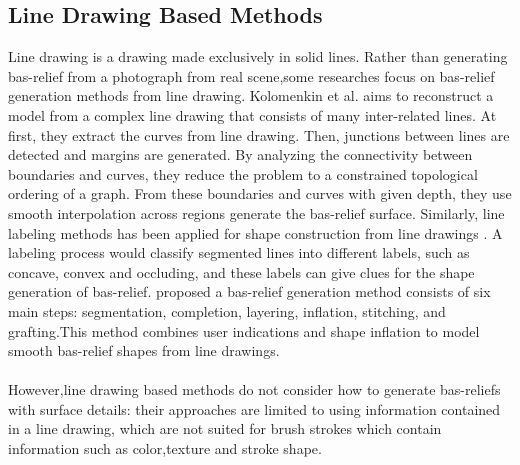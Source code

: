 \subsection{Line Drawing Based Methods}
Line drawing is a drawing made exclusively in solid lines. Rather than generating bas-relief from a photograph from real scene,some researches focus on bas-relief generation methods from line drawing.
Kolomenkin et al.\cite{kolomenkin2011reconstruction}  aims to reconstruct a model from a complex line drawing that consists of many inter-related lines. At first, they extract the curves from line drawing. Then, junctions between lines are detected and margins are generated. By analyzing the connectivity between boundaries and curves, they reduce the problem to a constrained topological ordering of a graph. From these boundaries and curves with given depth, they use smooth interpolation across regions generate the bas-relief surface. Similarly, line labeling methods has been applied for shape construction from line drawings  \cite{varley2002estimating}\cite{malik1987interpreting}\cite{sykora2014ink}. A labeling process would classify segmented lines into different labels, such as concave, convex and occluding, and these labels can give clues for the shape generation of bas-relief. 
\cite{sykora2014ink} proposed a bas-relief generation method consists of six main steps: segmentation, completion, layering, inflation, stitching, and grafting.This method combines user indications and shape inflation to model smooth bas-relief shapes from line drawings. \\ \\ 
However,line drawing based methods do not consider how to generate bas-reliefs with surface details: their approaches are limited to using information contained in a line drawing, which are not suited for brush strokes which contain information such as color,texture and stroke shape. 

